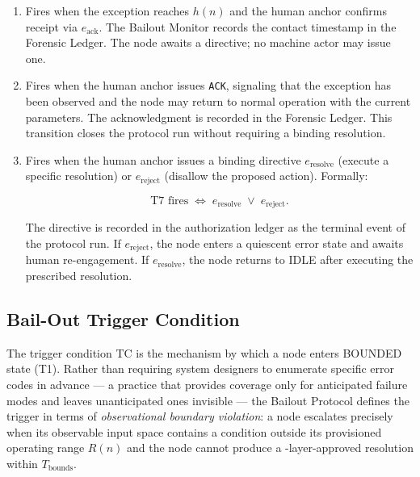 \begin{enumerate}
\item[\textbf{T5 --- ESCALATING $\rightarrow$ HUMAN\_ACKNOWLEDGED (contact):}] Fires when the exception reaches $h(n)$ and the human anchor confirms receipt via $e_{\text{ack}}$. The Bailout Monitor records the contact timestamp in the Forensic Ledger. The node awaits a directive; no machine actor may issue one.

\item[\textbf{T6 --- HUMAN\_ACKNOWLEDGED $\rightarrow$ IDLE (acknowledgment):}] Fires when the human anchor issues \texttt{ACK}, signaling that the exception has been observed and the node may return to normal operation with the current parameters. The acknowledgment is recorded in the Forensic Ledger. This transition closes the protocol run without requiring a binding resolution.

\item[\textbf{T7 --- ESCALATING $\rightarrow$ RESOLVED or HUMAN\_ACKNOWLEDGED $\rightarrow$ RESOLVED (directive):}] Fires when the human anchor issues a binding directive $e_{\text{resolve}}$ (execute a specific resolution) or $e_{\text{reject}}$ (disallow the proposed action). Formally:

\begin{equation}
\text{T7 fires} \;\iff\; e_{\text{resolve}} \;\lor\; e_{\text{reject}}. \tag{T7}
\end{equation}

The directive is recorded in the authorization ledger as the terminal event of the protocol run. If $e_{\text{reject}}$, the node enters a quiescent error state and awaits human re-engagement. If $e_{\text{resolve}}$, the node returns to IDLE after executing the prescribed resolution.
\end{enumerate}

\subsection{Bail-Out Trigger Condition}\label{sec:bailout-trigger}

The trigger condition TC is the mechanism by which a node enters BOUNDED state (T1). Rather than requiring system designers to enumerate specific error codes in advance --- a practice that provides coverage only for anticipated failure modes and leaves unanticipated ones invisible --- the Bailout Protocol defines the trigger in terms of \emph{observational boundary violation}: a node escalates precisely when its observable input space contains a condition outside its provisioned operating range $R(n)$ and the node cannot produce a \fact-layer-approved resolution within $T_{\text{bounds}}$.

